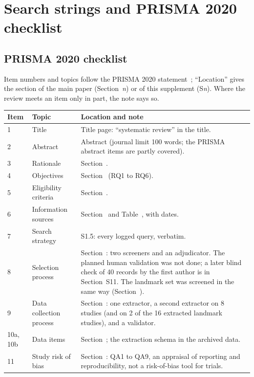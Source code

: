 \documentclass[acmsmall,screen]{acmart}
\makeatletter
\newcommand{\Mref}[1]{\@ifundefined{mr@#1}{\textbf{??}}{\csname mr@#1\endcsname}}
\makeatother
\begin{document}
\section{Search strings and PRISMA 2020 checklist}
\label{sec:s-search}

\subsection{PRISMA 2020 checklist}
Item numbers and topics follow the PRISMA 2020 statement~\cite{page2021prisma}; ``Location'' gives the section of the main paper (Section~\textit{n}) or of this supplement (S\textit{n}). Where the review meets an item only in part, the note says so.
{\small
\begin{longtable}{@{}p{1.2cm}p{3.6cm}p{7.8cm}@{}}
\toprule
Item & Topic & Location and note \\
\midrule
\endhead
1 & Title & Title page: ``systematic review'' in the title. \\
2 & Abstract & Abstract (journal limit 100 words; the PRISMA abstract items are partly covered). \\
3 & Rationale & Section~\Mref{sec:intro-why}. \\
4 & Objectives & Section~\Mref{sec:intro-rq} (RQ1 to RQ6). \\
5 & Eligibility criteria & Section~\Mref{sec:method-eligibility}. \\
6 & Information sources & Section~\Mref{sec:method-sources} and Table~\Mref{tab:sources}, with dates. \\
7 & Search strategy & S1.5: every logged query, verbatim. \\
8 & Selection process & Section~\Mref{sec:method-screening}: two screeners and an adjudicator. The planned human validation was not done; a later blind check of 40 records by the first author is in Section~S11. The landmark set was screened in the same way (Section~\Mref{sec:method-freeze}). \\
9 & Data collection process & Section~\Mref{sec:method-extraction}: one extractor, a second extractor on 8 studies (and on 2 of the 16 extracted landmark studies), and a validator. \\
10a, 10b & Data items & Section~\Mref{sec:method-extraction}; the extraction schema in the archived data. \\
11 & Study risk of bias & Section~\Mref{sec:method-extraction}: QA1 to QA9, an appraisal of reporting and reproducibility, not a risk-of-bias tool for trials. \\

\end{longtable}}
\end{document}
